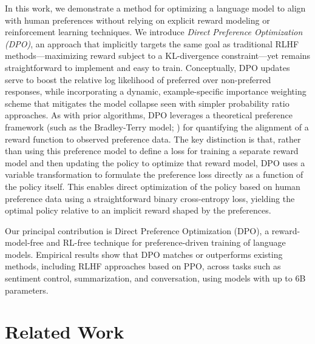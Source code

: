 In this work, we demonstrate a method for optimizing a language model to align with human preferences without relying on explicit reward modeling or reinforcement learning techniques. We introduce \textit{{Direct Preference Optimization} (DPO)}, an approach that implicitly targets the same goal as traditional RLHF methods—maximizing reward subject to a KL-divergence constraint—yet remains straightforward to implement and easy to train. Conceptually, DPO updates serve to boost the relative log likelihood of preferred over non-preferred responses, while incorporating a dynamic, example-specific importance weighting scheme that mitigates the model collapse seen with simpler probability ratio approaches. As with prior algorithms, DPO leverages a theoretical preference framework (such as the Bradley-Terry model; \cite{bradley1952rankanalysis}) for quantifying the alignment of a reward function to observed preference data. The key distinction is that, rather than using this preference model to define a loss for training a separate reward model and then updating the policy to optimize that reward model, DPO uses a variable transformation to formulate the preference loss directly as a function of the policy itself. This enables direct optimization of the policy based on human preference data using a straightforward binary cross-entropy loss, yielding the optimal policy relative to an implicit reward shaped by the preferences.

Our principal contribution is Direct Preference Optimization (DPO), a reward-model-free and RL-free technique for preference-driven training of language models. Empirical results show that DPO matches or outperforms existing methods, including RLHF approaches based on PPO, across tasks such as sentiment control, summarization, and conversation, using models with up to 6B parameters.

\section{Related Work}

